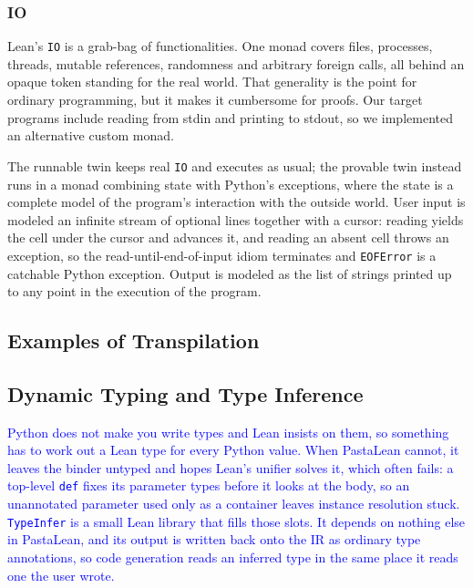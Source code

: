 \documentclass{article}
\newcommand{\code}{\lstinline}
\newcommand{\suggest}[1]{\textcolor{blue}{#1}}
\begin{document}
\subsubsection{IO}\label{sec:io}

Lean's \code{IO} is a grab-bag of functionalities. One monad covers files, processes, threads, mutable references,
randomness and arbitrary foreign calls, all behind an opaque token standing for the real world. That generality is the point for ordinary programming, but it makes it cumbersome for proofs. Our target programs include reading from stdin and printing to stdout, so we implemented an alternative custom monad.

The runnable twin keeps real \code{IO} and executes as usual; the provable twin instead runs in a monad combining state with Python's exceptions, where the state is a complete model of the
program's interaction with the outside world. User input is modeled an infinite stream of optional lines together
with a cursor: reading yields the cell under the cursor and advances it, and reading an absent cell throws an exception, so the read-until-end-of-input idiom terminates and \code{EOFError}
is a catchable Python exception. Output is modeled as the list of
strings printed up to any point in the execution of the program.

\subsection{Examples of Transpilation}\label{sec:transpilation}

\subsection{Dynamic Typing and Type Inference}
\label{sec:typeinfer}

\suggest{Python does not make you write types and Lean insists on them, so something has to work out a Lean type for every Python value. When PastaLean cannot, it leaves the binder untyped and hopes Lean's unifier solves it, which often fails: a top-level \code{def} fixes its parameter types before it looks at the body, so an unannotated parameter used only as a container leaves instance resolution stuck. \code{TypeInfer} is a small Lean library that fills those slots. It depends on nothing else in PastaLean, and its output is written back onto the IR as ordinary type annotations, so code generation reads an inferred type in the same place it reads one the user wrote.}
\end{document}
